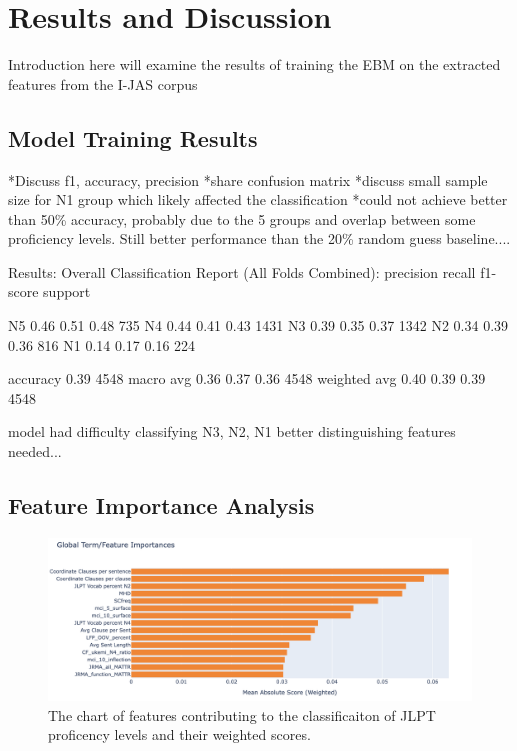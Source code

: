 \chapter{Results and Discussion}
Introduction
    here will examine the results of training the EBM on the extracted features from the I-JAS corpus


\section{Model Training Results}
*Discuss f1, accuracy, precision
*share confusion matrix
*discuss small sample size for N1 group which likely affected the classification
*could not achieve better than 50\% accuracy, probably due to the 5 groups and overlap between some proficiency
levels. Still better performance than the 20\% random guess baseline....

Results:
 Overall Classification Report (All Folds Combined):
              precision    recall  f1-score   support

          N5       0.46      0.51      0.48       735
          N4       0.44      0.41      0.43      1431
          N3       0.39      0.35      0.37      1342
          N2       0.34      0.39      0.36       816
          N1       0.14      0.17      0.16       224

    accuracy                           0.39      4548
   macro avg       0.36      0.37      0.36      4548
weighted avg       0.40      0.39      0.39      4548

model had difficulty classifying N3, N2, N1 better distinguishing features needed...
\section{Feature Importance Analysis}
\begin{figure}[h!]
    \centering
    \includegraphics[scale=.4]{img/feature_importance}
    \caption{The chart of features contributing to the classificaiton of JLPT proficency levels and their weighted scores.}
    \label{fig:featureimportance}
\end{figure}


